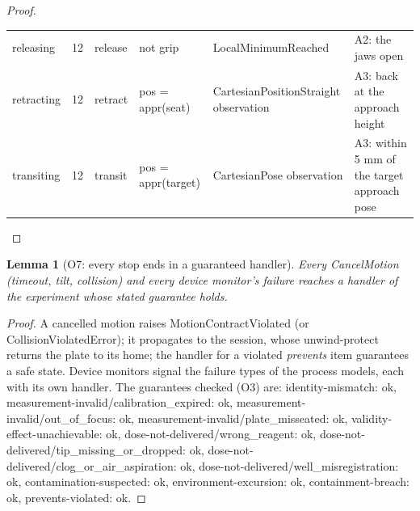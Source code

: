 \documentclass[10pt,a4paper]{article}
\theoremstyle{plain}\newtheorem{theorem}{Theorem}\newtheorem{lemma}{Lemma}\newtheorem{corollary}{Corollary}
\theoremstyle{definition}\newtheorem{definition}{Definition}\newtheorem{assumption}{Assumption}
\theoremstyle{remark}\newtheorem*{remark}{Remark}
\begin{document}
\begin{proof}
\begin{table}[h]
\begin{tabularx}{\linewidth}{@{}lrllXX@{}}
releasing & 12 & release & not grip & LocalMinimumReached & A2: the jaws open \\
retracting & 12 & retract & pos = appr(seat) & CartesianPositionStraight observation & A3: back at the approach height \\
transiting & 12 & transit & pos = appr(target) & CartesianPose observation & A3: within 5 mm of the target approach pose
\\\bottomrule\end{tabularx}\end{table}
\end{proof}

\begin{lemma}[O7: every stop ends in a guaranteed handler]
Every CancelMotion (timeout, tilt, collision) and every device monitor's failure reaches a handler of the experiment
whose stated guarantee holds.
\end{lemma}
\begin{proof}
A cancelled motion raises MotionContractViolated (or CollisionViolatedError); it propagates to the session, whose
unwind-protect returns the plate to its home; the handler for a violated \textit{prevents} item guarantees a safe state.
Device monitors signal the failure types of the process models, each with its own handler. The guarantees checked
(O3) are: identity-mismatch: ok, measurement-invalid/calibration\_expired: ok, measurement-invalid/out\_of\_focus: ok, measurement-invalid/plate\_misseated: ok, validity-effect-unachievable: ok, dose-not-delivered/wrong\_reagent: ok, dose-not-delivered/tip\_missing\_or\_dropped: ok, dose-not-delivered/clog\_or\_air\_aspiration: ok, dose-not-delivered/well\_misregistration: ok, contamination-suspected: ok, environment-excursion: ok, containment-breach: ok, prevents-violated: ok.
\end{proof}
\end{document}
